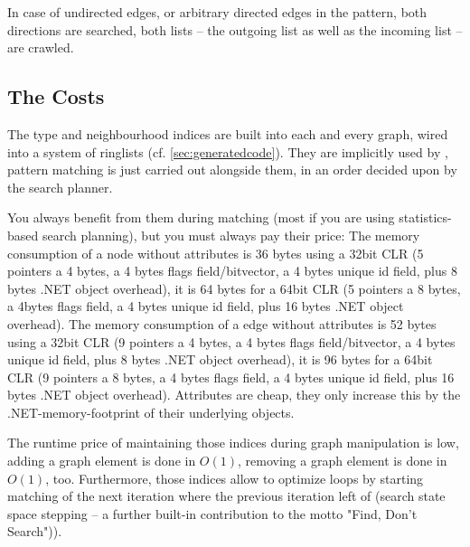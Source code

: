 In case of undirected edges, or arbitrary directed edges in the pattern, both directions are searched,
both lists -- the outgoing list as well as the incoming list -- are crawled.

\pagebreak %

\subsection{The Costs}\label{sec:performancememory} 
The type and neighbourhood indices are built into each and every \GrG{} graph, wired into a system of ringlists (cf. \ref{sec:generatedcode}).
They are implicitly used by \GrG{}, pattern matching is just carried out alongside them, in an order decided upon by the search planner. 

You always benefit from them during matching (most if you are using statistics-based search planning), but you must always pay their price:
The memory consumption of a \GrG{} node without attributes is 36 bytes using a 32bit CLR (5 pointers a 4 bytes, a 4 bytes flags field/bitvector, a 4 bytes unique id field, plus 8 bytes .NET object overhead), it is 64 bytes for a 64bit CLR (5 pointers a 8 bytes, a 4bytes flags field, a 4 bytes unique id field, plus 16 bytes .NET object overhead).
The memory consumption of a \GrG{} edge without attributes is 52 bytes using a 32bit CLR (9 pointers a 4 bytes, a 4 bytes flags field/bitvector, a 4 bytes unique id field, plus 8 bytes .NET object overhead), it is 96 bytes for a 64bit CLR (9 pointers a 8 bytes, a 4 bytes flags field, a 4 bytes unique id field, plus 16 bytes .NET object overhead).
Attributes are cheap, they only increase this by the .NET-memory-footprint of their underlying objects.

The runtime price of maintaining those indices during graph manipulation is low, adding a graph element is done in $O(1)$, removing a graph element is done in $O(1)$, too. 
Furthermore, those indices allow to optimize loops by starting matching of the next iteration where the previous iteration left of (search state space stepping -- a further built-in contribution to the motto "Find, Don't Search")).

